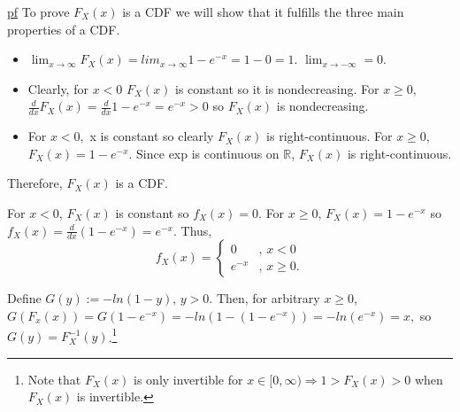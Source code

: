 \documentclass[11pt]{article} %
\begin{document}
\underline{pf} To prove $F_X(x)$ is a CDF we will show that it fulfills the three main properties of a CDF.
\begin{itemize}
\item $\lim_{x \rightarrow \infty}F_X(x) = lim_{x \rightarrow \infty} 1 - e^{-x} = 1 - 0 =1.$ $\lim_{x \rightarrow -\infty} = 0.$
\item Clearly, for $x<0$ $F_X(x)$ is constant so it is nondecreasing. For $x \geq 0,$ $\frac{d}{dx} F_X(x) = \frac{d}{dx} 1 - e^{-x} = e^{-x} > 0$ so $F_X(x)$ is nondecreasing. 
\item For $x<0,$ x is constant so clearly $F_X(x)$ is right-continuous. For $x \geq 0$, $F_X(x) = 1 - e^{-x}$. Since exp is continuous on $\mathbb{R}$, $F_X(x)$ is right-continuous.
\end{itemize}
Therefore, $F_X(x)$ is a CDF.

For $x<0$, $F_X(x)$ is constant so $f_X(x)=0$. For $x\geq 0$, $F_X(x) = 1 - e^{-x}$ so $f_X(x) = \frac{d}{dx} \left(1 - e^{-x} \right) = e^{-x}$. Thus, 
\begin{equation*}
f_X(x) = 
\begin{cases}
0 &\text{, $x<0$} \\
e^{-x} &\text{, $x\geq 0$}.
\end{cases}
\end{equation*}

Define $G(y) := %
- ln(1-y) \text{, $y>0$}
$. Then, for arbitrary $x \geq 0$, $G(F_x(x)) = G(1 - e^{-x}) = -ln(1-(1-e^{-x})) = -ln(e^{-x}) = x,$ so $G(y) = F_{X}^{-1}(y)$.\footnote{Note that $F_X(x)$ is only invertible for $x \in [0,\infty ) \Rightarrow 1>F_X(x) > 0$ when $F_X(x)$ is invertible.}
\end{document}
